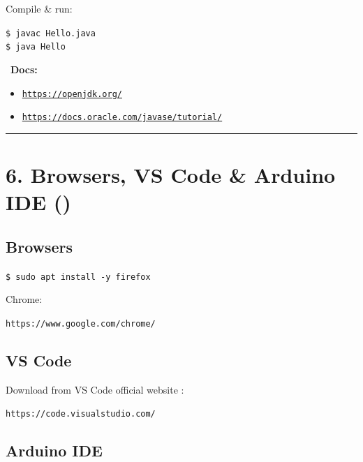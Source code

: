 \documentclass[12pt]{article}
\newcommand{\browsericon}{\faFirefox}
\newcommand{\bookicon}{\faBook}
\begin{document}
Compile \& run:

\begin{highlightbox}
\texttt{\$ javac Hello.java}\\
\texttt{\$ java Hello}
\end{highlightbox}

\begin{infobox}
\bookicon\ \textbf{Docs:}
\begin{itemize}
    \item \href{https://openjdk.org/}{\texttt{https://openjdk.org/}}
    \item \href{https://docs.oracle.com/javase/tutorial/}{\texttt{https://docs.oracle.com/javase/tutorial/}}
\end{itemize}
\end{infobox}

\vspace{1em}
\begin{center}
\color{teamred}\rule{0.8\textwidth}{1pt}
\end{center}

\section*{6. Browsers, VS Code \& Arduino IDE (\browsericon)}

\subsection*{Browsers}

\begin{highlightbox}
\texttt{\$ sudo apt install -y firefox}
\end{highlightbox}

Chrome:

\begin{highlightbox}
\texttt{https://www.google.com/chrome/}
\end{highlightbox}

\subsection*{VS Code}

Download from VS Code official website :

\begin{highlightbox}
\texttt{https://code.visualstudio.com/}
\end{highlightbox}

\subsection*{Arduino IDE}
\end{document}
